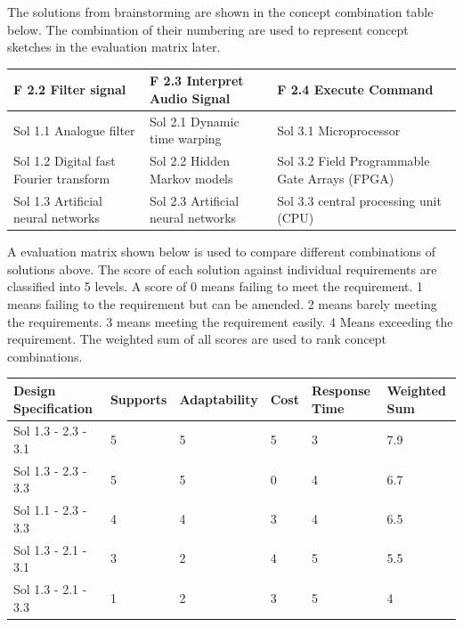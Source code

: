 \documentclass{article}
\begin{document}
The solutions from brainstorming are shown in the concept combination table below. The combination of their numbering are used to represent concept sketches in the evaluation matrix later.\\
\begin{center}
\begin{longtable}{| m{} | m{} | m{} |} 
 \hline
 F 2.2 Filter signal & F 2.3 Interpret Audio Signal & F 2.4 Execute Command \\ 
 \hline\hline
 Sol 1.1 Analogue filter & Sol 2.1 Dynamic time warping & Sol 3.1 Microprocessor \\ 
 \hline
 Sol 1.2 Digital fast Fourier transform & Sol 2.2 Hidden Markov models & Sol 3.2 Field Programmable Gate Arrays (FPGA) \\ 
 \hline
 Sol 1.3 Artificial neural networks & Sol 2.3 Artificial neural networks & Sol 3.3 central processing unit (CPU) \\ 
 \hline
\end{longtable}
\end{center}
A evaluation matrix shown below is used to compare different combinations of solutions above. The score of each solution against individual requirements are classified into 5 levels. A score of 0 means failing to meet the requirement. 1 means failing to the requirement but can be amended. 2 means barely meeting the requirements. 3 means meeting the requirement easily. 4 Means exceeding the requirement. The weighted sum of all scores are used to rank concept combinations.\\
\begin{center}
\begin{longtable}{| m{} | m{} | m{} | m{} | m{} | m{} |} 
 \hline
  Design Specification & Supports & Adaptability & Cost & Response Time & Weighted Sum \\ 
 \hline
  Sol 1.3 - 2.3 - 3.1 & 5 & 5 & 5 & 3 & 7.9\\ 
 \hline
  Sol 1.3 - 2.3 - 3.3 & 5 & 5 & 0 & 4 & 6.7\\ 
  \hline
  Sol 1.1 - 2.3 - 3.3 & 4 & 4 & 3 & 4 & 6.5\\   
 \hline
  Sol 1.3 - 2.1 - 3.1 & 3 & 2 & 4 & 5 & 5.5\\   
 \hline
  Sol 1.3 - 2.1 - 3.3 & 1 & 2 & 3 & 5 & 4\\   
 \hline
\end{longtable}
\end{center}
\end{document}
